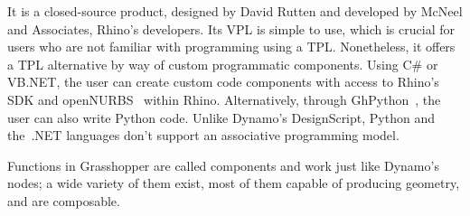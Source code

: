 It is a closed-source product, designed by David Rutten and developed by McNeel
and Associates, Rhino's developers.  Its \ac{VPL} is simple to use, which is
crucial for users who are not familiar with programming using a \ac{TPL}.
Nonetheless, it offers a \ac{TPL} alternative by way of custom programmatic
components.  Using C\# or VB.NET, the user can create custom code components
with access to Rhino's \ac{SDK} and openNURBS~\cite{Lear:2018:openNURBS} within
Rhino.  Alternatively, through GhPython~\cite{Giulio:2017:GhPython}, the user
can also write Python code.  Unlike Dynamo's DesignScript, Python and the~.NET
languages don't support an associative programming model.

Functions in Grasshopper are called components and work just like Dynamo's
nodes; a wide variety of them exist, most of them capable of producing geometry,
and are composable.
